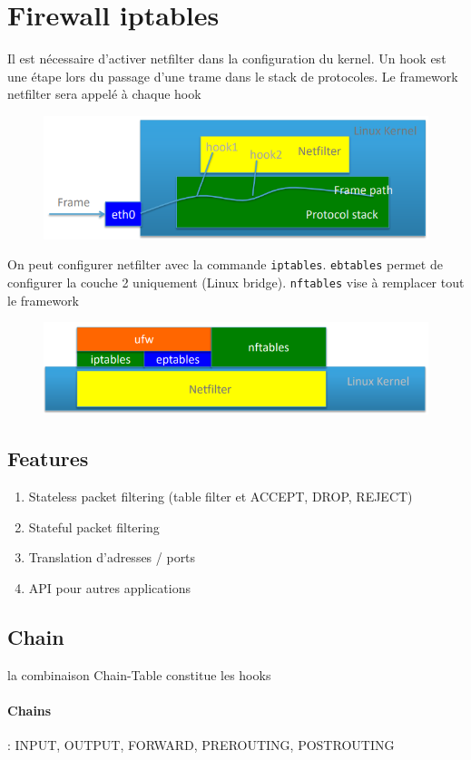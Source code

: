 \documentclass[resume]{subfiles}
\begin{document}
\section{Firewall iptables}
Il est nécessaire d'activer netfilter dans la configuration du kernel. Un hook est une étape lors du passage d'une trame dans le stack de protocoles. Le framework netfilter sera appelé à chaque hook
\begin{figure}[H]
\centering
\includegraphics[width=0.75\columnwidth]{img_6.png}
\end{figure}
On peut configurer netfilter avec la commande \verb!iptables!. \verb!ebtables! permet de configurer la couche 2 uniquement (Linux bridge). \verb!nftables! vise à remplacer tout le framework
\begin{figure}[H]
\centering
\includegraphics[width=0.5\columnwidth]{img_7.png}
\end{figure}
\subsection{Features}
\begin{enumerate}
\item Stateless packet filtering (table filter et ACCEPT, DROP, REJECT)
\item Stateful packet filtering
\item Translation d'adresses / ports
\item API pour autres applications
\end{enumerate}
\subsection{Chain}
la combinaison Chain-Table constitue les hooks
\paragraph{Chains} : INPUT, OUTPUT, FORWARD, PREROUTING, POSTROUTING
\end{document}
